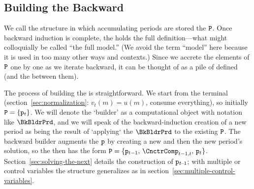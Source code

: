 \documentclass[titlepage, headings=optiontotocandhead]{econark}
\begin{document}
% 





\hypertarget{building-pile}{}
\subsection{Building the {\PileName} Backward}\label{subsec:building-pile}

We call the structure in which accumulating periods are stored the {\pileName} $\mathtt{P}$. Once backward induction is complete, the {\pileName} holds the full definition---what might colloquially be called ``the full model.''  (We avoid the term ``model'' here because it is used in too many other ways and contexts.)  Since we accrete the elements of $\mathtt{P}$ one by one as we iterate backward, it can be thought of as a pile of defined {\intervals} (and the {\Cncts} between them).

The process of building the {\pileName} is straightforward.  We start from the terminal {\interval} (section~\ref{sec:normalization}: $v_{t}(m) = u(m)$, consume everything), so initially $\mathtt{P} = \{\mathtt{p}_{t}\}$.  We will denote the `builder' as a computational object with notation like $\BkBldrPrd$, and we will speak of the backward-induction creation of a new period as being the result of `applying` the $\BkBldrPrd$ to the existing $\mathtt{P}$.  The backward builder augments the $\mathtt{p}$ by creating a new {\Cnct} and then the new period's solution, so the {\pileName} then has the form $\Pile = \{\pile_{t-1},\, \CnctrComp_{t-1,t},\, \pile_{t}\}$.  Section~\ref{sec:solving-the-next} details the construction of $\mathtt{p}_{t\!-\!1}$; with multiple {\stgs} or control variables the structure generalizes as in section~\ref{sec:multiple-control-variables}.
\end{document}
